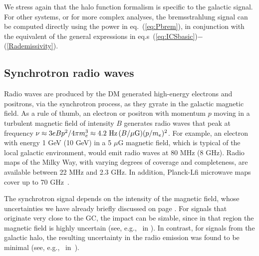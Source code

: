 \medskip

We stress again that the halo function formalism is specific to the galactic signal. For other systems, or for more complex analyses, the bremsstrahlung signal can be computed
directly using the power in eq.~(\ref{eq:Pbrem}), in conjunction with the equivalent of the general expressions in eq.s~(\ref{eq:ICSbasic})$-$(\ref{Rademissivity}).

\subsection{Synchrotron radio waves}
\label{sec:synchr}

Radio waves are produced by the DM generated high-energy electrons and positrons, via the synchrotron process, as they gyrate in the galactic magnetic field. 
As a rule of thumb, an electron or positron with momentum $p$ moving in a turbulent magnetic field of intensity $B$ generates radio waves that peak at frequency $\nu \approx 3 e B p^2/4\pi m_e^3 \approx 4.2 \ {\rm Hz}\, (B/\mu {\rm G}) (p/m_e)^2$. 
For example, an electron with energy 1 GeV (10 GeV) in a 5 $\mu$G magnetic field, which is typical of the local galactic environment, would emit radio waves at 80 MHz (8 GHz).
Radio maps of the Milky Way, with varying degrees of coverage and completeness, are available between 22 MHz and 2.3 GHz. In addition, {\sc Planck-Lfi} microwave maps cover up to 70 GHz~\cite{Planckresults}.


The synchrotron signal depends on the intensity of the magnetic field, whose uncertainties we have already briefly discussed on page \pageref{Bgalactic}. 
For signals that originate very close to the GC, the impact can be sizable, since in that region the magnetic field is highly uncertain (see, e.g.,~ in \cite{DMradiobounds}).  
In contrast, for signals from the galactic halo, the resulting uncertainty in the radio emission was found to be minimal (see, e.g.,~ in~\cite{CRenergylosses}).


\medskip

